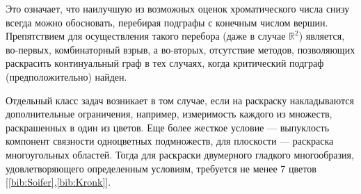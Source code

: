 Это означает, что наилучшую из возможных оценок хроматического числа снизу всегда можно обосновать, перебирая подграфы с конечным числом вершин. Препятствием для осуществления такого перебора (даже в случае $\mathbb{R}^2$) является, во-первых, комбинаторный взрыв, а во-вторых, отсутствие методов, позволяющих раскрасить континуальный граф в тех случаях, когда критический подграф (предположительно) найден.

Отдельный класс задач возникает в том случае, если на раскраску накладываются дополнительные ограничения, например, измеримость каждого из множеств, раскрашенных в один из цветов. Еще более жесткое условие — выпуклость компонент связности одноцветных подмножеств, для плоскости — раскраска многоугольных областей. Тогда для раскраски двумерного гладкого многообразия, удовлетворяющего определенным условиям, требуется не менее 7 цветов [\ref{bib:Soifer},\ref{bib:Kronk}].